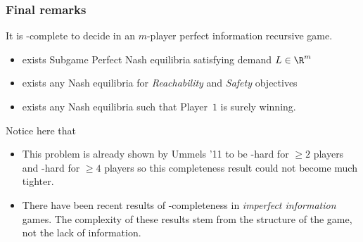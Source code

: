\documentclass[english, aspectratio=169]{beamer}
\begin{document}
\begin{frame}
  \frametitle{Final remarks}

  It is \cETR-complete to decide in an $m$-player perfect information recursive
  game.
  \begin{itemize}
  \item exists Subgame Perfect Nash equilibria satisfying demand $L \in \R^m$
  \item exists any Nash equilibria for \emph{Reachability} and \emph{Safety} objectives
  \item exists any Nash equilibria such that Player~$1$ is surely winning.
  \end{itemize}

  \pause
  
  Notice here that
  \begin{itemize}
  \item This problem is already shown by Ummels '11 to be \cNP-hard for $\geq 2$
    players and \cSqrtSum-hard for $\geq 4$ players so this completeness result
    could not become much tighter.
    
  \item There have been recent results of \cETR-completeness in \emph{imperfect
      information} games. The complexity of these results stem from the
    structure of the game, not the lack of information.
  \end{itemize}
  
\end{frame}
\end{document}
